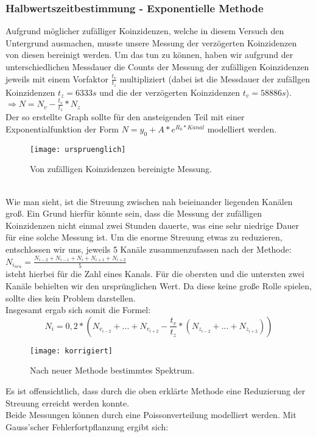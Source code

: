 \subsubsection{Halbwertszeitbestimmung - Exponentielle Methode}
Aufgrund möglicher zufälliger Koinzidenzen, welche in diesem Versuch den Untergrund ausmachen, musste unsere Messung der verzögerten Koinzidenzen von diesen bereinigt werden. Um das tun zu können, haben wir aufgrund der unterschiedlichen Messdauer die Counts der Messung der zufälligen Koinzidenzen jeweils mit einem Vorfaktor $\frac{t_{v}}{t_{z}}$ multipliziert (dabei ist die Messdauer der zufällgen Koinzidenzen $t_{z}=6333 s$ und die der verzögerten Koinzidenzen $t_{v}=58886 s$).\\
$\Rightarrow N=N_{v}-\frac{t_{v}}{t_{z}}*N_{z}$\\
Der so erstellte Graph sollte für den ansteigenden Teil mit einer Exponentialfunktion der Form $N=y_{0}+A*e^{R_{0}*Kanal}$ modelliert werden. \\
\begin{figure}[h]
\texttt{[image: urspruenglich]}
\caption{Von zufälligen Koinzidenzen bereinigte Messung.}
\end{figure}\\
Wie man sieht, ist die Streuung zwischen nah beieinander liegenden Kanälen groß. Ein Grund hierfür könnte sein, dass die Messung der zufälligen Koinzidenzen nicht einmal zwei Stunden dauerte, was eine sehr niedrige Dauer für eine solche Messung ist. Um die enorme Streuung etwas zu reduzieren, entschlossen wir uns, jeweils 5 Kanäle zusammenzufassen nach der Methode:\\ $N_{i_{neu}}=\frac{N_{i-2}+N_{i-1}+N_{i}+N_{i+1}+N_{i+2}}{5}$\\
\glqq i\grqq steht hierbei für die Zahl eines Kanals. Für die obersten und die untersten zwei Kanäle behielten wir den ursprünglichen Wert. Da diese keine große Rolle spielen, sollte dies kein Problem darstellen.\\
Insgesamt ergab sich somit die Formel:\\
\[N_{i}=0,2*(N_{v_{i-2}}+...+N_{v_{i+2}}-\frac{t_{v}}{t_{z}}*(N_{z_{i-2}}+...+N_{z_{i+2}}))\]
\clearpage
\begin{figure}[h]
\texttt{[image: korrigiert]}
\caption{Nach neuer Methode bestimmtes Spektrum.}
\end{figure}
Es ist offensichtlich, dass durch die oben erklärte Methode eine Reduzierung der Streuung erreicht werden konnte.\\
Beide Messungen können durch eine Poissonverteilung modelliert werden. Mit Gauss'scher Fehlerfortpflanzung ergibt sich:\\
